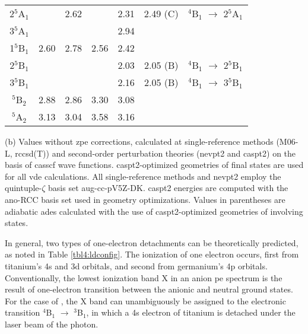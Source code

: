 \begin{refsection}
\begin{table}[htb!]
\begin{threeparttable}
\begin{tabular}{@{}ccccccc@{}}
	2$^5$A$_1$    &        & 2.62     &        & 2.31   & 2.49 (C)   & $^4$B$_1$ $\longrightarrow$ 2$^5$A$_1$       \\
	3$^5$A$_1$    &        &          &        & 2.94   &            &                  \\
	1$^5$B$_1$    & 2.60   & 2.78     & 2.56   & 2.42   &            &                  \\
	2$^5$B$_1$    &        &          &        & 2.03   & 2.05 (B)   & $^4$B$_1$ $\longrightarrow$ 2$^5$B$_1$       \\
	3$^5$B$_1$    &        &          &        & 2.16   & 2.05 (B)   & $^4$B$_1$ $\longrightarrow$ 3$^5$B$_1$       \\
	$^5$B$_2$     & 2.88   & 2.86     & 3.30   & 3.08   &            &                  \\
	$^5$A$_2$     & 3.13   & 3.04     & 3.58   & 3.16   &            &                  \\ \bottomrule
	\end{tabular}
	\begin{tablenotes}
		\item[(b)] Values without \acrshort{zpe} corrections, calculated at single-reference methods (M06-L, \acrshort{rccsd}(T)) and second-order perturbation theories (\acrshort{nevpt2} and \acrshort{caspt2}) on the basis of \acrshort{casscf} wave functions. \acrshort{caspt2}-optimized geometries of final states are used for all \acrshort{vde} calculations. All single-reference methods and \acrshort{nevpt2} employ the quintuple-$\zeta$ basis set aug-cc-pV5Z-DK. \acrshort{caspt2} energies are computed with the \acrshort{ano}-RCC basis set used in geometry optimizations. Values in parentheses are adiabatic \acrshort{ade}s calculated with the use of \acrshort{caspt2}-optimized geometries of involving states.
	\end{tablenotes}
	\end{threeparttable}
	\end{table}





In general, two types of one-electron detachments can be theoretically predicted, as noted in Table \ref{tbl4:ldconfig}. The ionization of one electron occurs, first from titanium's 4s and 3d orbitals, and second from germanium's 4p orbitals. Conventionally, the lowest ionization band X in an anion \acrshort{pe} spectrum is the result of one-electron transition between the anionic and neutral ground states. For the case of , the X band can unambiguously be assigned to the electronic transition $^4$B$_1$ $\longrightarrow$ $^3$B$_1$, in which a 4s electron of titanium is detached under the laser beam of the photon. 





\end{refsection}
